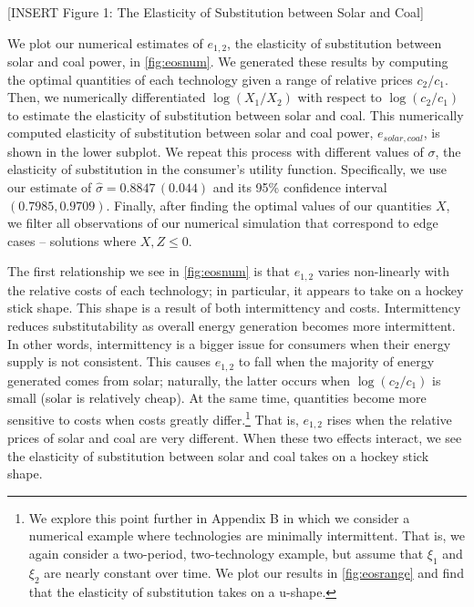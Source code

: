 \documentclass[11pt,a4paper,leqno]{extarticle}
\begin{document}
	\vspace{0.15in}
	\begin{center}
		[INSERT Figure 1: The Elasticity of Substitution between Solar and Coal]
	\end{center}
	\vspace{0.15in}
	
	
	We plot our numerical estimates of $e_{1, 2}$, the elasticity of substitution between solar and coal power, in \autoref{fig:eosnum}. We generated these results by computing the optimal quantities of each technology given a range of relative prices $c_2/c_1$. Then, we numerically differentiated $\log(X_1/X_2)$ with respect to $\log(c_2/c_1)$ to estimate the elasticity of substitution between solar and coal. This numerically computed elasticity of substitution between solar and coal power, $e_{solar,coal}$, is shown in the lower subplot. We repeat this process with different values of $\sigma$, the elasticity of substitution in the consumer's utility function. Specifically, we use our estimate of $\hat{\sigma} = 0.8847\, (0.044)$ and its 95\%  confidence interval $(0.7985, 0.9709)$.  Finally, after finding the optimal values of our quantities $X$, we filter all observations of our numerical simulation that correspond to edge cases -- solutions where $X, Z \leq  0$.
	
	
	
	The first relationship we see in \autoref{fig:eosnum} is that $e_{1,2}$ varies non-linearly with the relative costs of each technology; in particular, it appears to take on a hockey stick shape. This shape is a result of both intermittency and costs. Intermittency reduces substitutability as overall energy generation becomes more intermittent. In other words, intermittency is a bigger issue for consumers when their energy supply is not consistent. This causes $e_{1,2}$ to fall when the majority of energy generated comes from solar; naturally, the latter occurs when $\log(c_2/c_1)$ is small (solar is relatively cheap). At the same time, quantities become more sensitive to costs when costs greatly differ.\footnote{We explore this point further in Appendix B in which we consider a numerical example where technologies are minimally intermittent. That is, we again consider a two-period, two-technology example, but assume that $\xi_1$ and $\xi_2$ are nearly constant over time. We plot our results in \autoref{fig:eosrange} and find that the elasticity of substitution takes on a u-shape. } That is, $e_{1,2}$ rises when the relative prices of solar and coal are very different. When these two effects interact, we see the elasticity of substitution between solar and coal takes on a hockey stick shape. 
	
\end{document}
